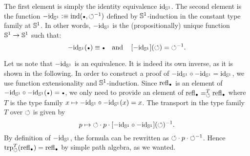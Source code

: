 \documentclass[english,a4paper]{lmcs}
\begin{document}
The first element is simply the identity equivalence $\mathord{\mathrm{id}}_{{\mathbb S^{1}}}$. The
second element is the function
$-\id_\Sc \defequi \ind(\base,\inv{\Sloop})$ defined by
${{\mathbb S^{1}}}$-induction in the constant type family at ${{\mathbb S^{1}}}$. In other words,
$-\mathord{\mathrm{id}}_{{\mathbb S^{1}}}$ is the (propositionally) unique function ${{\mathbb S^{1}}} \to {{\mathbb S^{1}}}$ such
that:
\begin{displaymath}
  -\id_\Sc(\base) \jdeq \base%
  \quad\text{and}\quad%
  \ap{-\id_\Sc}(\Sloop) = \inv{\Sloop}.
\end{displaymath}

Let us note that $-\mathord{\mathrm{id}}_{{\mathbb S^{1}}}$ is an equivalence. It is indeed its own inverse, as
it is shown in the following. In order to construct a proof of $-\mathord{\mathrm{id}}_{{\mathbb S^{1}}} \circ
-\mathord{\mathrm{id}}_{{\mathbb S^{1}}} = \mathord{\mathrm{id}}_{{\mathbb S^{1}}}$, we use function extensionality and ${{\mathbb S^{1}}}$-induction.
Since $\refl\base$ is an element of $-\id_\Sc\circ -\id_\Sc (\base) = \base$,
we only need to provide an element of $\pathover {\refl\base} T \Sloop
{\refl\base}$ where $T$ is the type family $x \mapsto -\mathord{\mathrm{id}}_{{\mathbb S^{1}}} \circ -\mathord{\mathrm{id}}_{{\mathbb S^{1}}} (x)
= x$. The transport in the type family $T$ over $\mathord{\circlearrowleft}$ is given by
\begin{displaymath}
  p \mapsto \mathord{\circlearrowleft} \cdot p \cdot [-\mathord{\mathrm{id}}_{{\mathbb S^{1}}} \circ -\mathord{\mathrm{id}}_{{\mathbb S^{1}}}](\mathord{\circlearrowleft})^{-1}.
\end{displaymath}
By definition of $-\mathord{\mathrm{id}}_{{\mathbb S^{1}}}$, the formula can be rewritten as $\mathord{\circlearrowleft} \cdot p
\cdot \mathord{\circlearrowleft}^{-1}$.  Hence $\trp[T] \Sloop (\refl\base) = \refl\base$ by simple
path algebra, as we wanted.
\end{document}
